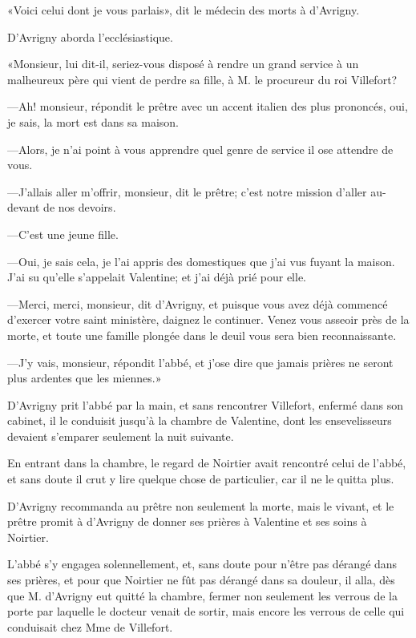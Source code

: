 «Voici celui dont je vous parlais», dit le médecin des morts à d'Avrigny. 

D'Avrigny aborda l'ecclésiastique. 

«Monsieur, lui dit-il, seriez-vous disposé à rendre un grand service à un malheureux père qui vient de perdre sa fille, à M. le procureur du roi Villefort? 

—Ah! monsieur, répondit le prêtre avec un accent italien des plus prononcés, oui, je sais, la mort est dans sa maison. 

—Alors, je n'ai point à vous apprendre quel genre de service il ose attendre de vous. 

—J'allais aller m'offrir, monsieur, dit le prêtre; c'est notre mission d'aller au-devant de nos devoirs. 

—C'est une jeune fille. 

—Oui, je sais cela, je l'ai appris des domestiques que j'ai vus fuyant la maison. J'ai su qu'elle s'appelait Valentine; et j'ai déjà prié pour elle. 

—Merci, merci, monsieur, dit d'Avrigny, et puisque vous avez déjà commencé d'exercer votre saint ministère, daignez le continuer. Venez vous asseoir près de la morte, et toute une famille plongée dans le deuil vous sera bien reconnaissante. 

—J'y vais, monsieur, répondit l'abbé, et j'ose dire que jamais prières ne seront plus ardentes que les miennes.» 

D'Avrigny prit l'abbé par la main, et sans rencontrer Villefort, enfermé dans son cabinet, il le conduisit jusqu'à la chambre de Valentine, dont les ensevelisseurs devaient s'emparer seulement la nuit suivante. 

En entrant dans la chambre, le regard de Noirtier avait rencontré celui de l'abbé, et sans doute il crut y lire quelque chose de particulier, car il ne le quitta plus. 

D'Avrigny recommanda au prêtre non seulement la morte, mais le vivant, et le prêtre promit à d'Avrigny de donner ses prières à Valentine et ses soins à Noirtier. 

L'abbé s'y engagea solennellement, et, sans doute pour n'être pas dérangé dans ses prières, et pour que Noirtier ne fût pas dérangé dans sa douleur, il alla, dès que M. d'Avrigny eut quitté la chambre, fermer non seulement les verrous de la porte par laquelle le docteur venait de sortir, mais encore les verrous de celle qui conduisait chez Mme de Villefort. 